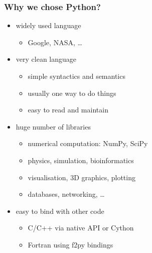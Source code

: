 \documentclass{beamer}
\begin{document}
\begin{frame}[fragile]
    \frametitle{Why we chose Python?}

    \begin{itemize}
        \item<1-> widely used language
            \begin{itemize}
                \item Google, NASA, \ldots
            \end{itemize}
        \item<2-> very clean language
            \begin{itemize}
                \item simple syntactics and semantics
                \item usually one way to do things
                \item easy to read and maintain
            \end{itemize}
        \item<3-> huge number of libraries
            \begin{itemize}
                \item numerical computation: NumPy, SciPy
                \item physics, simulation, bioinformatics
                \item visualisation, 3D graphics, plotting
                \item databases, networking, \ldots
            \end{itemize}
        \item<4-> easy to bind with other code
            \begin{itemize}
                \item C/C++ via native API or Cython
                \item Fortran using f2py bindings
            \end{itemize}
    \end{itemize}
\end{frame}
\end{document}
